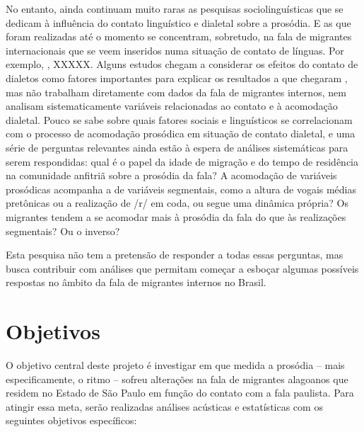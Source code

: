 \documentclass[
		a4paper,	%
		12pt,		%
		]{article}	%
\begin{document}
	No entanto, ainda continuam muito raras as pesquisas sociolinguísticas que
	se dedicam à influência do contato linguístico e dialetal sobre a prosódia. E
	as que foram realizadas até o momento se concentram, sobretudo, na fala de
	migrantes internacionais que se veem inseridos numa situação de contato de
	línguas. Por exemplo, \citep{Carter2005}, XXXXX.
	Alguns estudos chegam a considerar os efeitos do
	contato de dialetos como fatores importantes para explicar os resultados a que
	chegaram \citep{Torgersen.Szakay2012, Fagyal2010}, 
	mas não trabalham
	diretamente com dados da fala de migrantes internos, nem analisam
	sistematicamente variáveis relacionadas ao contato e à acomodação dialetal.
	Pouco se sabe sobre quais fatores sociais e linguísticos se correlacionam
	com o processo de acomodação prosódica em situação de contato dialetal, e
	uma série de perguntas relevantes ainda estão à espera de análises
	sistemáticas para serem respondidas: qual é o papel da idade de migração e
	do tempo de residência na comunidade anfitriã sobre a prosódia da fala? A
	acomodação de variáveis prosódicas acompanha a de variáveis segmentais, como a altura de vogais médias pretônicas ou a realização de /r/ em coda, ou
	segue uma dinâmica própria? Os migrantes tendem a se acomodar mais à
	prosódia da fala do que às realizações segmentais? Ou o inverso? 
		
	Esta pesquisa não tem a pretensão de responder a todas essas perguntas, mas
	busca contribuir com análises que permitam começar a esboçar algumas
	possíveis respostas no âmbito da fala de migrantes internos no Brasil.
	

	\section{Objetivos} \label{objetivos}

	O objetivo central deste projeto é investigar em que medida a prosódia -- mais especificamente, o ritmo -- 
	sofreu alterações na fala de migrantes alagoanos que residem no Estado de São Paulo 
	em função do contato com a fala paulista. Para atingir essa meta, serão
	realizadas análises acústicas e estatísticas com os seguintes objetivos
	específicos:
\end{document}
